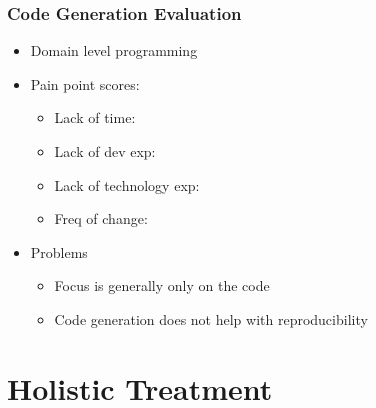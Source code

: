 \documentclass[usenames,dvipsnames]{beamer}
\newcommand{\cross}{{\LARGE {\color{red}\ding{55}}}}
\newcommand{\greencheck}{{\LARGE {\color{ForestGreen}\checkmark}}}
\begin{document}

\begin{frame}

  \frametitle{Code Generation Evaluation}

  \begin{itemize}
  \item Domain level programming
  \item Pain point scores:
  \begin{itemize}
    \item Lack of time: \greencheck %
    \item Lack of dev exp: \greencheck %
    \item Lack of technology exp: \cross %
    \item Freq of change: \greencheck %
  \end{itemize}
  \item Problems
  \begin{itemize}
    \item Focus is generally only on the code
    \item Code generation does not help with reproducibility
  \end{itemize}
\end{itemize}

\end{frame}
  

\section[Holistic]{Holistic Treatment}

\end{document}
